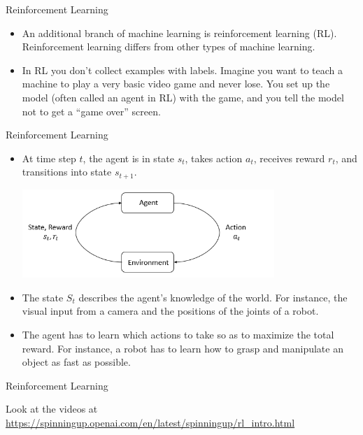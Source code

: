 \documentclass{beamer}
\begin{document}
\begin{frame}{Reinforcement Learning}

\begin{itemize}
\item An additional branch of machine learning is reinforcement learning (RL). Reinforcement learning differs from other types of machine learning. 

\item In RL you don't collect examples with labels. Imagine you want to teach a machine to play a very basic video game and never lose. You set up the model (often called an agent in RL) with the game, and you tell the model not to get a ``game over'' screen. 
\end{itemize}
\end{frame}

\begin{frame}{Reinforcement Learning}

\begin{itemize}

\item At time step $t$, the agent is in state $s_t$, takes action $a_t$, receives reward $r_t$, and transitions into state $s_{t+1}$.

\includegraphics[width=0.75\textwidth]{images/rl_diagram_transparent_bg.png}

\item The state $S_t$ describes the agent's knowledge of the world. For instance, the visual input from a camera and the positions of the joints of a robot.

\item The agent has to learn which actions to take so as to maximize the total reward.  For instance, a robot has to learn how to grasp and manipulate an object as fast as possible.
\end{itemize}

\end{frame}


\begin{frame}{Reinforcement Learning}

Look at the videos at \url{https://spinningup.openai.com/en/latest/spinningup/rl\_intro.html}

\end{frame}
\end{document}
